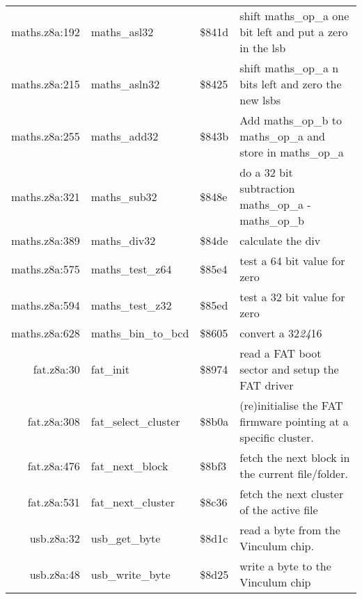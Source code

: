 \begin{tabular}{rllp{7cm}}
 maths.z8a:192&maths\_asl32&\$841d&shift maths\_op\_a one bit left and put a zero in the lsb\\
 maths.z8a:215&maths\_asln32&\$8425&shift maths\_op\_a n bits left and zero the new lsbs\\
 maths.z8a:255&maths\_add32&\$843b&Add maths\_op\_b to maths\_op\_a and store in maths\_op\_a\\
 maths.z8a:321&maths\_sub32&\$848e&do a 32 bit subtraction maths\_op\_a - maths\_op\_b\\
 maths.z8a:389&maths\_div32&\$84de&calculate the div\\
 maths.z8a:575&maths\_test\_z64&\$85e4&test a 64 bit value for zero\\
 maths.z8a:594&maths\_test\_z32&\$85ed&test a 32 bit value for zero\\
 maths.z8a:628&maths\_bin\_to\_bcd&\$8605&convert a 32\textit{24}16\\
 fat.z8a:30&fat\_init&\$8974&read a FAT boot sector and setup the FAT driver\\
 fat.z8a:308&fat\_select\_cluster&\$8b0a&(re)initialise the FAT firmware pointing at a specific cluster.\\
 fat.z8a:476&fat\_next\_block&\$8bf3&fetch the next block in the current file/folder.\\
 fat.z8a:531&fat\_next\_cluster&\$8c36&fetch the next cluster of the active file\\
 usb.z8a:32&usb\_get\_byte&\$8d1c&read a byte from the Vinculum chip.\\
 usb.z8a:48&usb\_write\_byte&\$8d25&write a byte to the Vinculum chip\\
\end{tabular}

